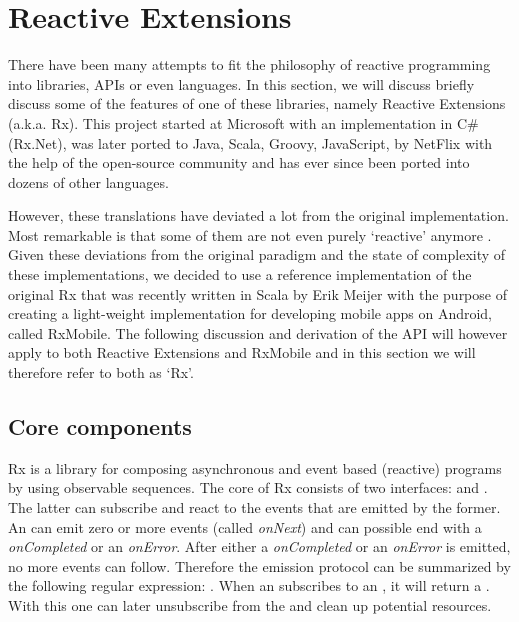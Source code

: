 \section{Reactive Extensions}
There have been many attempts to fit the philosophy of reactive programming into libraries, APIs or even languages.  In this section, we will discuss briefly discuss some of the features of one of these libraries, namely Reactive Extensions (a.k.a. Rx). This project started at Microsoft with an implementation in C\#  (Rx.Net), was later ported to Java, Scala, Groovy, JavaScript,  by NetFlix with the help of the open-source community and has ever since been ported into dozens of other languages.


However, these translations have deviated a lot from the original implementation. Most remarkable is that some of them are not even purely `reactive' anymore . Given these deviations from the original paradigm and the state of complexity of these implementations, we decided to use a reference implementation of the original Rx that was recently written in Scala by Erik Meijer with the purpose of creating a light-weight implementation for developing mobile apps on Android, called RxMobile.  The following discussion and derivation of the API will however apply to both Reactive Extensions and RxMobile and in this section we will therefore refer to both as `Rx'.

\subsection{Core components}
\label{subsec:core-comps}
Rx is a library for composing asynchronous and event based (reactive) programs by using observable sequences. The core of Rx consists of two interfaces: \obs and \obv. The latter can subscribe and react to the events that are emitted by the former. An \obs can emit zero or more events (called \textit{onNext}) and can possible end with a \textit{onCompleted} or an \textit{onError}. After either a \textit{onCompleted} or an \textit{onError} is emitted, no more events can follow. Therefore the emission protocol can be summarized by the following regular expression: .  When an \obv subscribes to an \obs,  it will return a \subs. With this one can later unsubscribe from the \obs and clean up potential resources.

